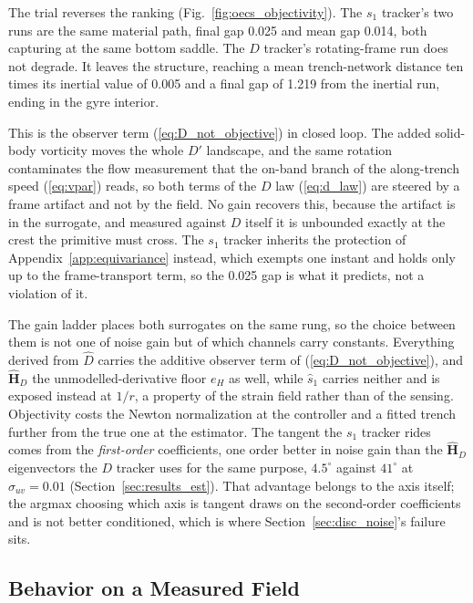 \documentclass[lettersize,journal]{IEEEtran}
\begin{document}
The trial reverses the ranking
(Fig.~\ref{fig:oecs_objectivity}). The $s_1$ tracker's two runs are the
same material path, final gap 0.025 and mean gap 0.014, both capturing
at the same bottom saddle. The $D$ tracker's rotating-frame run does not
degrade. It leaves the structure, reaching a mean trench-network
distance ten times its inertial value of 0.005 and a final gap of 1.219
from the inertial run, ending in the gyre interior.

This is the observer term (\ref{eq:D_not_objective}) in closed loop. The
added solid-body vorticity moves the whole $D'$ landscape, and the same
rotation contaminates the flow measurement that the on-band branch of
the along-trench speed (\ref{eq:vpar}) reads, so both terms of the $D$
law (\ref{eq:d_law}) are steered by a frame artifact and not by the
field. No gain recovers this, because the artifact is in the surrogate,
and measured against $D$ itself it is unbounded exactly at the crest the
primitive must cross. The $s_1$ tracker inherits the protection of
Appendix~\ref{app:equivariance} instead, which exempts one instant and
holds only up to the frame-transport term, so the 0.025 gap is what it
predicts, not a violation of it.

The gain ladder places both surrogates on the same rung,
so the choice between them is not one of noise gain but of which
channels carry constants. Everything derived from $\hat{D}$ carries the
additive observer term of (\ref{eq:D_not_objective}), and
$\hat{\mathbf{H}}_D$ the unmodelled-derivative floor $e_H$ as well,
while $\hat{s}_1$ carries neither and is exposed instead at $1/r$, a
property of the strain field rather than of the sensing. Objectivity
costs the Newton normalization at the controller and a fitted trench
further from the true one at the estimator. The tangent the $s_1$
tracker rides comes from the
\emph{first-order} coefficients, one order better in noise gain than
the $\hat{\mathbf{H}}_D$ eigenvectors the $D$ tracker uses for the same
purpose, $4.5^\circ$ against $41^\circ$ at $\sigma_{uv} = 0.01$
(Section~\ref{sec:results_est}). That advantage belongs to the axis
itself; the argmax choosing which axis is tangent draws on the
second-order coefficients and is not better conditioned, which is where
Section~\ref{sec:disc_noise}'s failure sits.

\subsection{Behavior on a Measured Field}
\label{sec:disc_ocean}
\end{document}
